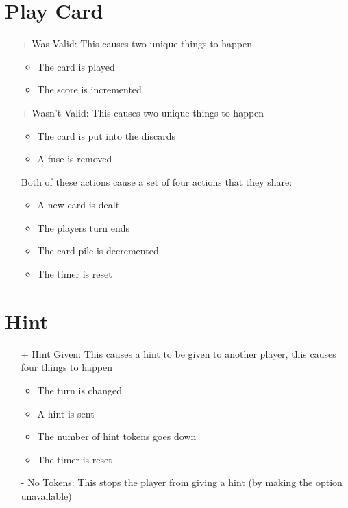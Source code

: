 \documentclass[12pt]{article}
\begin{document}
\section{Play Card}

\begin{itemize}

\item[+] Was Valid: This causes two unique things to happen
\begin{itemize}
\item The card is played
\item The score is incremented
\end{itemize}
\item[+] Wasn't Valid: This causes two unique things to happen
\begin{itemize}
\item The card is put into the discards
\item A fuse is removed
\end{itemize}
Both of these actions cause a set of four actions that they share:
\begin{itemize}
\item A new card is dealt
\item The players turn ends
\item The card pile is decremented
\item The timer is reset
\end{itemize}
\end{itemize}

\section{Hint}

\begin{itemize}
\item [+] Hint Given: This causes a hint to be given to another player, this causes four
things to happen
\begin{itemize}
\item The turn is changed
\item A hint is sent
\item The number of hint tokens goes down
\item The timer is reset
\end{itemize}

\item [-] No Tokens: This stops the player from giving a hint (by making the
option unavailable)

\end{itemize}
\end{document}
